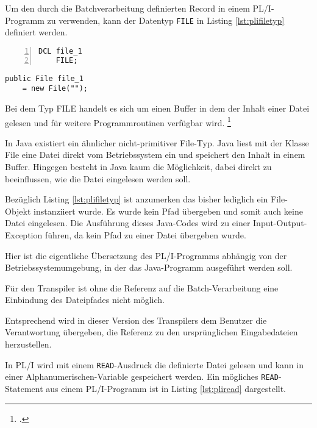Um den durch die Batchverarbeitung definierten Record in einem PL/I-Programm zu verwenden, kann der Datentyp \verb+FILE+ in Listing \ref{lst:plifiletyp} definiert werden.

\begin{minipage}[b]{0.48\linewidth}
	\centering
	\lstset{language=PL/I,label=SliceExaple}
	\begin{lstlisting}[frame=single, numbers=left, mathescape,%
		caption={Dateityp}, label={lst:plifiletyp}]
	DCL file_1 
	FILE;
	\end{lstlisting}
\end{minipage}
\hspace{0.5cm}
\begin{minipage}[b]{0.48\linewidth}
	\centering
	\lstset{language=Java,label=SliceExaple}
	\begin{lstlisting}[frame=single, mathescape,%
		title={" "}]
	public File file_1
	= new File("");
	\end{lstlisting}
\end{minipage}  

Bei dem Typ FILE handelt es sich um einen Buffer in dem der Inhalt einer Datei gelesen und für weitere Programmroutinen verfügbar wird. \footcite[Vgl. ][ S.305ff. ]{pliref}

In Java existiert ein ähnlicher nicht-primitiver File-Typ.
Java liest mit der Klasse File eine Datei direkt vom Betriebssystem ein und speichert den Inhalt in einem Buffer. 
Hingegen besteht in Java kaum die Möglichkeit, dabei direkt zu beeinflussen, wie die Datei eingelesen werden soll. 


Bezüglich Listing \ref{lst:plifiletyp} ist anzumerken das bisher lediglich ein File-Objekt instanziiert wurde.
Es wurde kein Pfad übergeben und somit auch keine Datei eingelesen. 
Die Ausführung dieses Java-Codes wird zu einer Input-Output-Exception führen, da kein Pfad zu einer Datei übergeben wurde.

Hier ist die eigentliche Übersetzung des PL/I-Programms abhängig von der Betriebssystemumgebung, in der das Java-Programm ausgeführt werden soll.

Für den Transpiler ist ohne die Referenz auf die Batch-Verarbeitung eine Einbindung des Dateipfades nicht möglich.

Entsprechend wird in dieser Version des Transpilers dem Benutzer die Verantwortung übergeben, die Referenz zu den ursprünglichen Eingabedateien herzustellen.

In PL/I wird mit einem \verb+READ+-Ausdruck die definierte Datei gelesen und kann in einer Alphanumerischen-Variable gespeichert werden.
Ein mögliches \verb+READ+-Statement aus einem PL/I-Programm ist in Listing \ref{lst:pliread} dargestellt.

